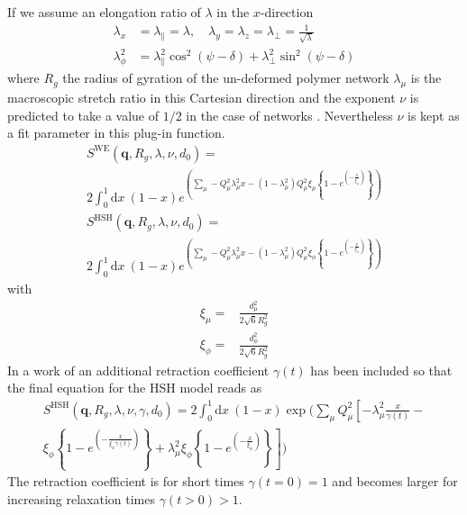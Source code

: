 If we assume an elongation ratio of $\lambda$ in the $x$-direction
\begin{align}
  \lambda_x &=\lambda_{\|}=\lambda, \quad \lambda_y=\lambda_z=\lambda_\perp=\frac{1}{\sqrt{\lambda}} \\
  \lambda_\phi^2 &= \lambda_{\|}^2 \cos^2(\psi-\delta)+\lambda_\perp^2\sin^2(\psi-\delta)
\end{align}
where $R_g$ the radius of gyration of the un-deformed polymer network $\lambda_\mu$ is the macroscopic stretch ratio in this Cartesian direction and the exponent $\nu$ is predicted to take a value of $1/2$ in the case of networks \cite{Straube1995,Read2004}.  Nevertheless $\nu$ is kept as a fit parameter in this plug-in function.
\begin{multline}
\label{eq:SQ_WE_HSH}
S^\mathrm{WE}(\mathbf{q},R_g,\lambda,\nu,d_0) = \\ 2\int_0^1\mathrm{d}x\: (1-x) e^{\left(\sum_{\mu} -Q_\mu^2\lambda_\mu^2 x-
(1-\lambda_\mu^2)Q_\mu^2\xi_\mu\left\{1-e^{\left(-\frac{x}{\xi_\mu}\right)}\right\}\right)}
\end{multline}
\begin{multline}
S^\mathrm{HSH}(\mathbf{q},R_g,\lambda,\nu,d_0) = \\ 2\int_0^1\mathrm{d}x\: (1-x) e^{\left(\sum_{\mu} -Q_\mu^2\lambda_\mu^2 x- %
 (1-\lambda_\mu^2)Q_\mu^2\xi_\phi\left\{1-e^{\left(-\frac{x}{\xi_\phi}\right)}\right\}\right)}
\end{multline}
with
\begin{align}
  \xi_\mu =& \frac{d_\mu^2}{2\sqrt{6}R_g^2} \\
  \xi_\phi =& \frac{d_\phi^2}{2\sqrt{6}R_g^2}
\end{align}
In a work of \cite{Ariane2004} an additional retraction coefficient $\gamma(t)$ has been included so that the final equation for the HSH model reads as
\begin{multline}
\label{eq:SQ_HSH_retraction}
S^\mathrm{HSH}(\mathbf{q},R_g,\lambda,\nu,\gamma,d_0) =  2\int_0^1\mathrm{d}x\: (1-x) \exp\Bigg(\sum_{\mu} Q_\mu^2\left[-\lambda_\mu^2\frac{x}{\gamma(t)}- \right. \\
\left. \xi_\phi\left\{1-e^{\left(-\frac{x}{\xi_\phi\gamma(t)}\right)}\right\} +\lambda_\mu^2\xi_\phi\left\{1-e^{\left(-\frac{x}{\xi_\phi}\right)}\right\} \right]\Bigg)
\end{multline}
The retraction coefficient is for short times $\gamma(t=0)=1$ and becomes larger for increasing relaxation times $\gamma(t>0)>1$.

